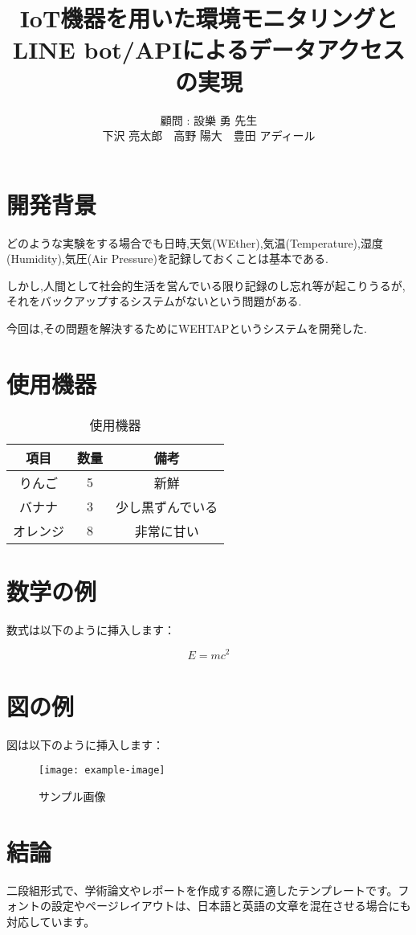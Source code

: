 \documentclass[a4paper,10pt,twocolumn]{article}
\title{IoT機器を用いた環境モニタリングと\\LINE bot/APIによるデータアクセスの実現}
\author{
顧問 : 設樂 勇 先生\\
下沢 亮太郎　高野 陽大　豊田 アディール
}
\date{}
\begin{document}
\maketitle


\section{開発背景}
どのような実験をする場合でも日時,天気(WEther),気温(Temperature),湿度(Humidity),気圧(Air Pressure)を記録しておくことは基本である.

しかし,人間として社会的生活を営んでいる限り記録のし忘れ等が起こりうるが,それをバックアップするシステムがないという問題がある.

今回は,その問題を解決するためにWEHTAPというシステムを開発した.

\section{使用機器}
\setlength{\tabcolsep}{12pt}
\renewcommand{\arraystretch}{1.5}

\begin{table}[h]
\centering
\begin{tabular}{|c|c|c|}
\hline
項目 & 数量 & 備考 \\
\hline
りんご & 5 & 新鮮 \\
バナナ & 3 & 少し黒ずんでいる \\
オレンジ & 8 & 非常に甘い \\
\hline
\end{tabular}
\caption{使用機器}
\label{tab:fruits}
\end{table}


\section{数学の例}
数式は以下のように挿入します：

\begin{equation}
E = mc^2
\end{equation}

\section{図の例}
図は以下のように挿入します：

\begin{figure}[h]
\centering
\texttt{[image: example-image]}
\caption{サンプル画像}
\label{fig:example}
\end{figure}


\section{結論}
二段組形式で、学術論文やレポートを作成する際に適したテンプレートです。フォントの設定やページレイアウトは、日本語と英語の文章を混在させる場合にも対応しています。
\end{document}
